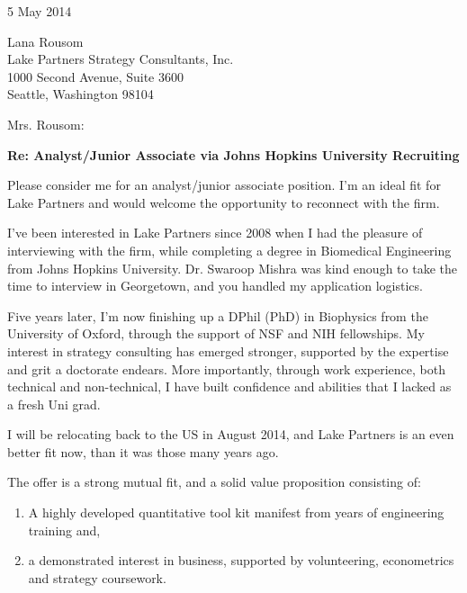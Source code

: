 \documentclass{../res}
\begin{document}
 
\begin{sloppypar}
 
%


\begin{resume} 
 
5 May 2014

Lana Rousom \\
Lake Partners Strategy Consultants, Inc. \\
1000 Second Avenue, Suite 3600 \\
Seattle, Washington 98104

Mrs. Rousom:

\textbf{Re: Analyst/Junior Associate via Johns Hopkins University Recruiting}

Please consider me for an analyst/junior associate position. I'm an ideal fit for Lake Partners and would welcome the opportunity to reconnect with the firm.

I've been interested in Lake Partners since 2008 when I had the pleasure of interviewing with the firm, while completing a degree in Biomedical Engineering from Johns Hopkins University. Dr. Swaroop Mishra was kind enough to take the time to interview in Georgetown, and you handled my application logistics. 

Five years later, I'm now finishing up a DPhil (PhD) in Biophysics from the University of Oxford, through the support of NSF and NIH fellowships. My interest in strategy consulting has emerged stronger, supported by the expertise and grit a doctorate endears. More importantly, through work experience, both technical and non-technical, I have built confidence and abilities that I lacked as a fresh Uni grad. 

I will be relocating back to the US in August 2014, and Lake Partners is an even better fit now, than it was those many years ago. 

The offer is a strong mutual fit, and a solid value proposition consisting of:
\begin{enumerate}
    \item A highly developed quantitative tool kit manifest from years of engineering training and,
    \item a demonstrated interest in business, supported by volunteering, econometrics and strategy coursework. 
\end{enumerate}



\end{resume}
\end{sloppypar}
\end{document}
